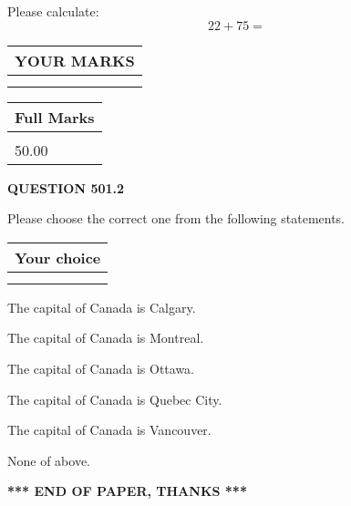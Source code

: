 \documentclass[12pt]{article}
\begin{document}
  
 
Please calculate:
\begin{equation}
22 +  %
75 = \nonumber
\end{equation}
 

 

 
  
\vspace{0.2in}
  
\noindent\begin{tabular}{|l|}
\hline
 YOUR MARKS  \\
\hline
 \\ 
 \\ 
\hline
\end{tabular}
\hspace{0.05in} \begin{tabular}{|l|}
\hline
 Full Marks  \\
\hline
 \\ 
50.00 \\
\hline
\end{tabular}
{\textbf{\Large{QUESTION
501.2 
}}}
  
  
Please choose the correct one from the following statements.
  
  
\noindent\hspace{3.0in} \begin{tabular}{|l|}
\hline
Your choice \\
\hline
 \\ 
 \\ 
\hline
\end{tabular}
  
  
 
 
The capital of Canada is Calgary.
 
 
The capital of Canada is Montreal.
 
 
The capital of Canada is Ottawa.
 
 
The capital of Canada is Quebec City.
 
 
The capital of Canada is Vancouver.
 
 
 None of above.
 
 
   
   
 \vspace{0.2in}
 
   
   
   
   
\vspace{1.0in} 
{\textbf{\large{ *** END OF PAPER, THANKS *** }}} 
   
\end{document}
